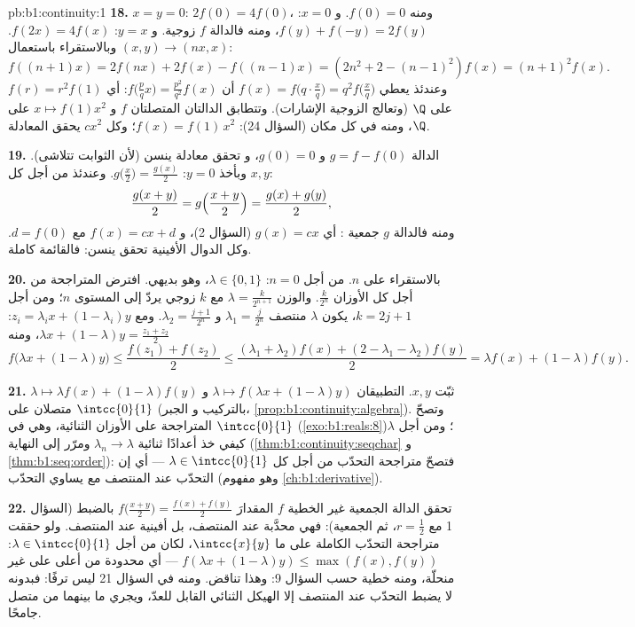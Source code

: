 \begin{solution}{pb:b1:continuity:1}
\textbf{18.} $x = y = 0$: $2f(0) = 4f(0)$، ومنه $f(0) = 0$. و $x =
0$: $f(y) + f(-y) = 2f(y)$، ومنه فالدالة $f$ زوجية. و $y = x$: $f(2x) =
4f(x)$. وبالاستقراء باستعمال $(x, y) \to (nx, x)$:
\[
f((n{+}1)x) = 2f(nx) + 2f(x) - f((n{-}1)x)
= (2n^2 + 2 - (n-1)^2) f(x) = (n+1)^2 f(x) .
\]
وعندئذ يعطي $f(x) = f\bigl(q\cdot\frac xq\bigr) = q^2 f\bigl(\frac
xq\bigr)$ أن $f\bigl(\frac pq x\bigr) = \frac{p^2}{q^2}f(x)$:
أي $f(r) = r^2 f(1)$ على $\Q$ (وتعالج الزوجية الإشارات). وتتطابق الدالتان
المتصلتان $f$ و $x \mapsto f(1)x^2$ على 
 $\Q$، ومنه في كل مكان (السؤال 24): $f(x) =
f(1)\,x^2$؛ وكل $cx^2$ يحقق المعادلة.

\textbf{19.} الدالة $g = f - f(0)$  و $g(0) = 0$، و
تحقق معادلة ينسن (لأن الثوابت تتلاشى). وبأخذ $y =
0$: $g\bigl(\frac x2\bigr) = \frac{g(x)}{2}$. وعندئذ من أجل كل $x,
y$:
\[
\frac{g(x + y)}{2} = g\Bigl(\frac{x+y}{2}\Bigr)
= \frac{g(x) + g(y)}{2} ,
\]
ومنه فالدالة $g$ جمعية : أي $g(x) = cx$ (السؤال 2)، و
$f(x) = cx + d$ مع $d = f(0)$. وكل الدوال الأفينية تحقق
ينسن: فالقائمة كاملة.

\textbf{20.} بالاستقراء على $n$. من أجل $n = 0$: $\lambda \in \{0,
1\}$، وهو بديهي. افترض المتراجحة من أجل كل الأوزان
$\frac{k}{2^n}$. والوزن $\lambda = \frac{k}{2^{n+1}}$ مع $k$
زوجي يردّ إلى المستوى $n$؛ ومن أجل $k = 2j + 1$، يكون $\lambda$
منتصف $\lambda_1 = \frac{j}{2^n}$ و $\lambda_2 =
\frac{j+1}{2^n}$. ومع $z_i = \lambda_i x + (1 - \lambda_i)y$:
$\lambda x + (1-\lambda)y = \frac{z_1 + z_2}{2}$، ومنه
\[
f\bigl(\lambda x + (1{-}\lambda)y\bigr)
\leq \frac{f(z_1) + f(z_2)}{2}
\leq \frac{(\lambda_1 + \lambda_2)f(x) + (2 - \lambda_1 -
\lambda_2)f(y)}{2}
= \lambda f(x) + (1 - \lambda)f(y) .
\]

\textbf{21.} ثبّت $x, y$. التطبيقان $\lambda \mapsto f(\lambda x +
(1 - \lambda)y)$ و $\lambda \mapsto \lambda f(x) + (1 -
\lambda)f(y)$ متصلان على $\intcc{0}{1}$ (بالتركيب و
الجبر، \cref{prop:b1:continuity:algebra}). وتصحّ المتراجحة
على الأوزان الثنائية، وهي  في $\intcc{0}{1}$
(\cref{exo:b1:reals:8})؛ ومن أجل $\lambda$ كيفي خذ أعدادًا ثنائية
$\lambda_n \to \lambda$ ومرّر إلى النهاية
(\cref{thm:b1:continuity:seqchar} و \cref{thm:b1:seq:order}):
فتصحّ متراجحة التحدّب من أجل كل $\lambda \in
\intcc{0}{1}$ --- أي إن التحدّب عند المنتصف مع  يساوي
التحدّب (وهو مفهوم \cref{ch:b1:derivative}).

\textbf{22.} تحقق الدالة الجمعية غير الخطية $f$ المقدارَ
$f\bigl(\frac{x+y}{2}\bigr) = \frac{f(x) + f(y)}{2}$ بالضبط
(السؤال 1 مع $r = \frac12$، ثم الجمعية): فهي محدَّبة عند
المنتصف، بل أفينية عند المنتصف. ولو حققت متراجحة
التحدّب الكاملة على  ما $\intcc{x}{y}$، لكان من أجل
$\lambda \in \intcc{0}{1}$: $f(\lambda x + (1-\lambda)y) \leq
\max(f(x), f(y))$ --- أي محدودة من أعلى على  غير منحلّة،
ومنه خطية حسب السؤال 9: وهذا تناقض. ومنه  في
السؤال 21 ليس ترفًا: فبدونه لا يضبط التحدّب عند المنتصف
إلا الهيكل الثنائي القابل للعدّ، ويجري ما بينهما
من متصل جامحًا.


\end{solution}
